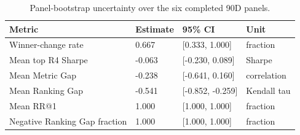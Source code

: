 \begin{table}[t]
\centering
\caption{Panel-bootstrap uncertainty over the six completed 90D panels.}
\label{tab:table_18_panel_bootstrap}
\begin{tabular}{llll}
\toprule
Metric & Estimate & 95\% CI & Unit \\
\midrule
Winner-change rate & 0.667 & [0.333, 1.000] & fraction \\
Mean top R4 Sharpe & -0.063 & [-0.230, 0.089] & Sharpe \\
Mean Metric Gap & -0.238 & [-0.641, 0.160] & correlation \\
Mean Ranking Gap & -0.541 & [-0.852, -0.259] & Kendall tau \\
Mean RR@1 & 1.000 & [1.000, 1.000] & fraction \\
Negative Ranking Gap fraction & 1.000 & [1.000, 1.000] & fraction \\
\bottomrule
\end{tabular}
\end{table}
